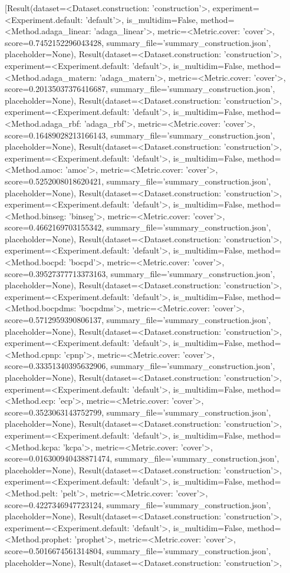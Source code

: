 [Result(dataset=<Dataset.construction: 'construction'>, experiment=<Experiment.default: 'default'>, is_multidim=False, method=<Method.adaga_linear: 'adaga_linear'>, metric=<Metric.cover: 'cover'>, score=0.7452152296043428, summary_file='summary_construction.json', placeholder=None), Result(dataset=<Dataset.construction: 'construction'>, experiment=<Experiment.default: 'default'>, is_multidim=False, method=<Method.adaga_matern: 'adaga_matern'>, metric=<Metric.cover: 'cover'>, score=0.20135037376416687, summary_file='summary_construction.json', placeholder=None), Result(dataset=<Dataset.construction: 'construction'>, experiment=<Experiment.default: 'default'>, is_multidim=False, method=<Method.adaga_rbf: 'adaga_rbf'>, metric=<Metric.cover: 'cover'>, score=0.16489028213166143, summary_file='summary_construction.json', placeholder=None), Result(dataset=<Dataset.construction: 'construction'>, experiment=<Experiment.default: 'default'>, is_multidim=False, method=<Method.amoc: 'amoc'>, metric=<Metric.cover: 'cover'>, score=0.5252008018620421, summary_file='summary_construction.json', placeholder=None), Result(dataset=<Dataset.construction: 'construction'>, experiment=<Experiment.default: 'default'>, is_multidim=False, method=<Method.binseg: 'binseg'>, metric=<Metric.cover: 'cover'>, score=0.4662169703155342, summary_file='summary_construction.json', placeholder=None), Result(dataset=<Dataset.construction: 'construction'>, experiment=<Experiment.default: 'default'>, is_multidim=False, method=<Method.bocpd: 'bocpd'>, metric=<Metric.cover: 'cover'>, score=0.39527377713373163, summary_file='summary_construction.json', placeholder=None), Result(dataset=<Dataset.construction: 'construction'>, experiment=<Experiment.default: 'default'>, is_multidim=False, method=<Method.bocpdms: 'bocpdms'>, metric=<Metric.cover: 'cover'>, score=0.5712959390806137, summary_file='summary_construction.json', placeholder=None), Result(dataset=<Dataset.construction: 'construction'>, experiment=<Experiment.default: 'default'>, is_multidim=False, method=<Method.cpnp: 'cpnp'>, metric=<Metric.cover: 'cover'>, score=0.33351340395632906, summary_file='summary_construction.json', placeholder=None), Result(dataset=<Dataset.construction: 'construction'>, experiment=<Experiment.default: 'default'>, is_multidim=False, method=<Method.ecp: 'ecp'>, metric=<Metric.cover: 'cover'>, score=0.3523063143752799, summary_file='summary_construction.json', placeholder=None), Result(dataset=<Dataset.construction: 'construction'>, experiment=<Experiment.default: 'default'>, is_multidim=False, method=<Method.kcpa: 'kcpa'>, metric=<Metric.cover: 'cover'>, score=0.016300940438871474, summary_file='summary_construction.json', placeholder=None), Result(dataset=<Dataset.construction: 'construction'>, experiment=<Experiment.default: 'default'>, is_multidim=False, method=<Method.pelt: 'pelt'>, metric=<Metric.cover: 'cover'>, score=0.4227346947723124, summary_file='summary_construction.json', placeholder=None), Result(dataset=<Dataset.construction: 'construction'>, experiment=<Experiment.default: 'default'>, is_multidim=False, method=<Method.prophet: 'prophet'>, metric=<Metric.cover: 'cover'>, score=0.5016674561314804, summary_file='summary_construction.json', placeholder=None), Result(dataset=<Dataset.construction: 'construction'>, 